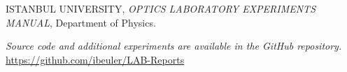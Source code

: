 \documentclass[journal]{IEEEtran}
\begin{document}
\begin{thebibliography}{9}
    ISTANBUL UNIVERSITY, \textit{OPTICS LABORATORY
    EXPERIMENTS MANUAL}, Department of Physics.

    \textit{Source code and additional experiments are available in the GitHub repository.} \url{https://github.com/ibeuler/LAB-Reports}
\end{thebibliography}
\end{document}
